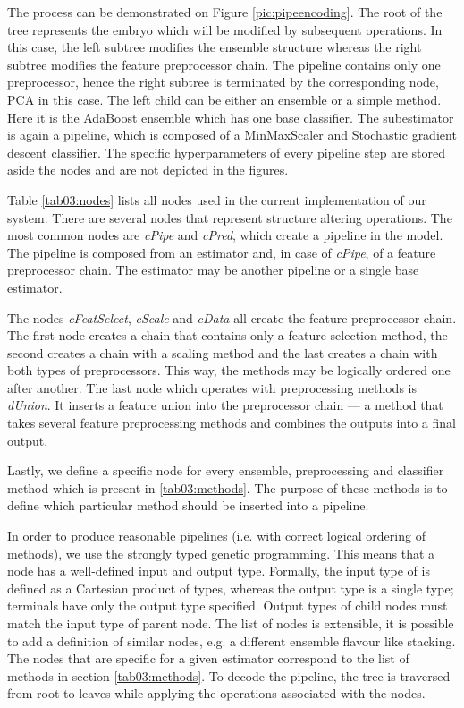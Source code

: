 The process can be demonstrated on Figure
\ref{pic:pipeencoding}. The root of the tree represents the embryo which will
be modified by subsequent operations. In this case, the left subtree modifies
the ensemble structure whereas the right subtree modifies the feature
preprocessor chain. The pipeline contains only one preprocessor, hence the
right subtree is terminated by the corresponding node, PCA in this case. The
left child can be
either an ensemble or a simple method. Here it is the AdaBoost ensemble which
has one base classifier. The subestimator is again a pipeline, which is composed
of a MinMaxScaler and Stochastic gradient descent classifier. The specific
hyperparameters of every pipeline step are stored aside the nodes and are not
depicted in the figures.

\label{sec:decoding}
Table \ref{tab03:nodes} lists all nodes used in the current implementation of
our system. There are several nodes that represent structure altering
operations. The most common nodes are \emph{cPipe} and \emph{cPred}, which
create a pipeline in the model. The pipeline is composed from an estimator
and, in case of \emph{cPipe}, of a feature preprocessor chain. The estimator
may be another pipeline or a single base estimator.

The nodes \emph{cFeatSelect}, \emph{cScale} and \emph{cData} all create the feature
preprocessor chain. The first node creates a chain that contains only a
feature selection method, the second creates a chain with a scaling method
and the last creates a chain with both types of preprocessors. This way, the
methods may be logically ordered one after another. The last node which
operates with preprocessing methods is \emph{dUnion}. It inserts a feature union
into the preprocessor chain --- a method that takes several feature
preprocessing methods and combines the outputs into a final output.

Lastly, we define a specific node for every ensemble, preprocessing and
classifier method which is present in \ref{tab03:methods}. The purpose of
these methods is to define which particular method should be inserted into
a pipeline.

In order to produce reasonable pipelines (i.e. with correct logical ordering of
methods), we use the strongly typed genetic programming.
This means that a node has a well-defined input and output type.
Formally, the input type of is defined as a Cartesian product of types,
whereas the output type is a single type; terminals have only the output type
specified. Output types of
child nodes must match the input type of parent node. The list of nodes
is extensible,
it is possible to add a definition of similar nodes, e.g. a different ensemble
flavour like stacking. The nodes that are specific for a given estimator
correspond to the list of methods in section \ref{tab03:methods}. To decode
the pipeline, the tree is traversed from root to leaves while applying the
operations associated with the nodes.

